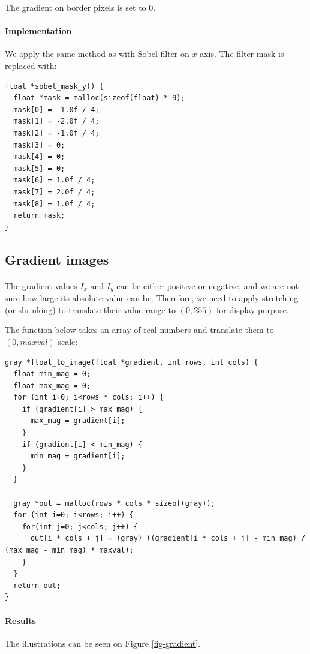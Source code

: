 \documentclass[a4paper, 10pt]{article}
\begin{document}
The gradient on border pixels is set to $0$.

\paragraph{Implementation}
We apply the same method as with Sobel filter on $x$-axis. The filter mask is replaced with:
\begin{lstlisting}[frame=single]
float *sobel_mask_y() {
  float *mask = malloc(sizeof(float) * 9);
  mask[0] = -1.0f / 4;
  mask[1] = -2.0f / 4;
  mask[2] = -1.0f / 4;
  mask[3] = 0;
  mask[4] = 0;
  mask[5] = 0;
  mask[6] = 1.0f / 4;
  mask[7] = 2.0f / 4;
  mask[8] = 1.0f / 4;
  return mask;
}
\end{lstlisting}

\subsection{Gradient images}
\paragraph{} The gradient values $I_x$ and $I_y$ can be either positive or negative, and we are not sure how large its absolute value can be. Therefore, we need to apply stretching (or shrinking) to translate their value range to $(0, 255)$ for display purpose.

The function below takes an array of real numbers and translate them to $(0, maxval)$ scale:
\begin{lstlisting}[frame=single]
gray *float_to_image(float *gradient, int rows, int cols) {
  float min_mag = 0;
  float max_mag = 0;
  for (int i=0; i<rows * cols; i++) {
    if (gradient[i] > max_mag) {
      max_mag = gradient[i];
    }
    if (gradient[i] < min_mag) {
      min_mag = gradient[i];
    }
  }

  gray *out = malloc(rows * cols * sizeof(gray));
  for (int i=0; i<rows; i++) {
    for(int j=0; j<cols; j++) {
      out[i * cols + j] = (gray) ((gradient[i * cols + j] - min_mag) / (max_mag - min_mag) * maxval);
    }
  }
  return out;
}
\end{lstlisting}

\paragraph{Results} The illustrations can be seen on Figure \ref{fig-gradient}.
\end{document}
